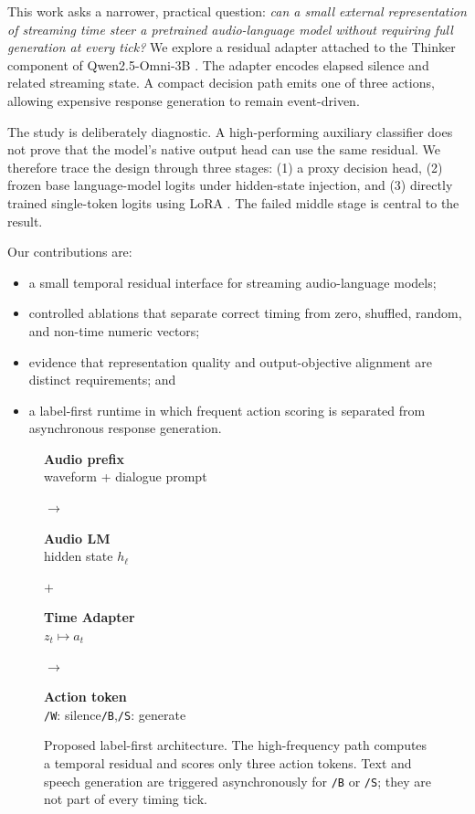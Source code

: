 \documentclass[10pt,twocolumn]{article}
\newcommand{\model}{Qwen2.5-Omni-3B}
\newcommand{\code}[1]{\texttt{#1}}
\begin{document}
This work asks a narrower, practical question: \emph{can a small external representation of streaming time steer a pretrained audio-language model without requiring full generation at every tick?} We explore a residual adapter attached to the Thinker component of \model{} \cite{xu2025qwenomni}. The adapter encodes elapsed silence and related streaming state. A compact decision path emits one of three actions, allowing expensive response generation to remain event-driven.

The study is deliberately diagnostic. A high-performing auxiliary classifier does not prove that the model's native output head can use the same residual. We therefore trace the design through three stages: (1) a proxy decision head, (2) frozen base language-model logits under hidden-state injection, and (3) directly trained single-token logits using LoRA \cite{hu2021lora}. The failed middle stage is central to the result.

Our contributions are:
\begin{itemize}
  \item a small temporal residual interface for streaming audio-language models;
  \item controlled ablations that separate correct timing from zero, shuffled, random, and non-time numeric vectors;
  \item evidence that representation quality and output-objective alignment are distinct requirements; and
  \item a label-first runtime in which frequent action scoring is separated from asynchronous response generation.
\end{itemize}

\begin{figure}[t]
\centering
\setlength{\fboxsep}{8pt}
\colorbox{softblue}{\parbox{0.18\textwidth}{\centering\textbf{Audio prefix}\\waveform + dialogue prompt}}
\hfill$\longrightarrow$\hfill
\colorbox{softblue}{\parbox{0.18\textwidth}{\centering\textbf{Audio LM}\\hidden state $h_{\ell}$}}
\hfill$+$\hfill
\colorbox{softorange}{\parbox{0.19\textwidth}{\centering\textbf{Time Adapter}\\$z_t\mapsto a_t$}}
\hfill$\longrightarrow$\hfill
\colorbox{softgreen}{\parbox{0.21\textwidth}{\centering\textbf{Action token}\\\code{/W}: silence\quad \code{/B},\code{/S}: generate}}
\caption{Proposed label-first architecture. The high-frequency path computes a temporal residual and scores only three action tokens. Text and speech generation are triggered asynchronously for \code{/B} or \code{/S}; they are not part of every timing tick.}
\label{fig:architecture}
\end{figure}
\end{document}
